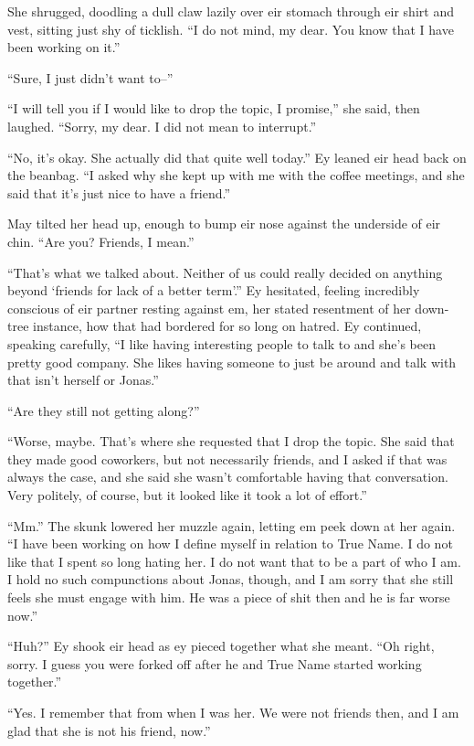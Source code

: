 She shrugged, doodling a dull claw lazily over eir stomach through eir shirt and vest, sitting just shy of ticklish. ``I do not mind, my dear. You know that I have been working on it.''

``Sure, I just didn't want to--''

``I will tell you if I would like to drop the topic, I promise,'' she said, then laughed. ``Sorry, my dear. I did not mean to interrupt.''

``No, it's okay. She actually did that quite well today.'' Ey leaned eir head back on the beanbag. ``I asked why she kept up with me with the coffee meetings, and she said that it's just nice to have a friend.''

May tilted her head up, enough to bump eir nose against the underside of eir chin. ``Are you? Friends, I mean.''

``That's what we talked about. Neither of us could really decided on anything beyond `friends for lack of a better term'.'' Ey hesitated, feeling incredibly conscious of eir partner resting against em, her stated resentment of her down-tree instance, how that had bordered for so long on hatred. Ey continued, speaking carefully, ``I like having interesting people to talk to and she's been pretty good company. She likes having someone to just be around and talk with that isn't herself or Jonas.''

``Are they still not getting along?''

``Worse, maybe. That's where she requested that I drop the topic. She said that they made good coworkers, but not necessarily friends, and I asked if that was always the case, and she said she wasn't comfortable having that conversation. Very politely, of course, but it looked like it took a lot of effort.''

``Mm.'' The skunk lowered her muzzle again, letting em peek down at her again. ``I have been working on how I define myself in relation to True Name. I do not like that I spent so long hating her. I do not want that to be a part of who I am. I hold no such compunctions about Jonas, though, and I am sorry that she still feels she must engage with him. He was a piece of shit then and he is far worse now.''

``Huh?'' Ey shook eir head as ey pieced together what she meant. ``Oh right, sorry. I guess you were forked off after he and True Name started working together.''

``Yes. I remember that from when I was her. We were not friends then, and I am glad that she is not his friend, now.''

